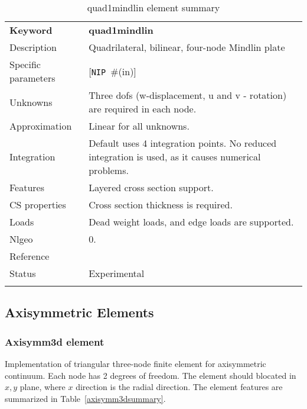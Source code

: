 \documentclass[a4paper]{article}
\newcommand{\param}[1]{\texttt{#1}} %
\newcommand{\optional}[1]{[#1]} %
\newcommand{\field}[2]{\param{#1}~\#{\tiny(#2)}} %
\newcommand{\optField}[2]{\optional{\field{#1}{#2}}}
\newcommand{\templabel}{}%
\newcommand{\tempcaption}{}%
\newcounter{nelpar}
\newenvironment{elementsummary}[5]{%
  \gdef\tempcaption{#4}%
  \gdef\templabel{#5}%
  \setcounter{nelpar}{0}%
  \begin{center} %
    \begin{table}[!htb] %
      \begin{tabular}{|l|p{9cm}|}\hline %
        {\bf Keyword} & \bf{#1}\\ %
        {Description} & {#2}\\ %
        {Specific parameters} & {#3}\\ \hline %
}{%
  \\ \hline %
      \end{tabular}%
      \caption{\tempcaption}%
      \label{\templabel}%
    \end{table}%
  \end{center}%
}
\newcommand{\elementParam}[1]{%
  \ifthenelse{\value{nelpar}>0} %
             {&{#1}}%
             {\setcounter{nelpar}{1}Parameters&{#1}}%
             \\%
}
\newcommand{\elementDescription}[2]{{#1} & {#2}\\ }
\begin{document}
\begin{elementsummary}{quad1mindlin}{Quadrilateral, bilinear, four-node Mindlin plate}{\optField{NIP}{in}}{quad1mindlin element summary}{quad1mindlinsummary}
\elementDescription{Unknowns}{Three dofs (w-displacement, u and v - rotation) are required in each node.}
\elementDescription{Approximation}{Linear for all unknowns.}
\elementDescription{Integration}{Default uses 4 integration points. No reduced integration is used, as it causes numerical problems.}
\elementDescription{Features}{Layered cross section support.}
\elementDescription{CS properties}{Cross section thickness is required.}
\elementDescription{Loads}{Dead weight loads, and edge loads are supported.}
\elementDescription{Nlgeo}{0.}
\elementDescription{Reference}{\cite{RobertCook1989}}
\elementDescription{Status}{Experimental}
\end{elementsummary}



\clearpage
\subsection{Axisymmetric Elements}
\subsubsection{Axisymm3d element}
Implementation of triangular three-node finite element 
for axisymmetric continuum. Each node has 2 degrees of freedom. 
The element should blocated in $x,y$ plane, where $x$ direction is the radial direction.
The element features are summarized in Table~\ref{axisymm3dsummary}.
\end{document}
